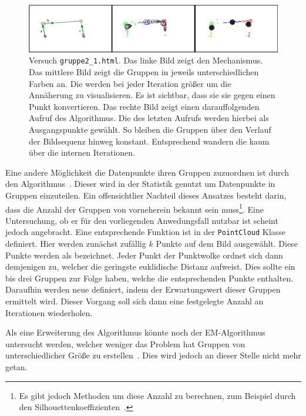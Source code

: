 \begin{figure}
    \centering
    \includegraphics[width=\textwidth]{gfx/k_means_centroids_edit.png}
    \caption[Versuch \lstinline{gruppe2_1.html}]{Versuch \lstinline{gruppe2_1.html}. Das linke Bild zeigt den Mechanismus. Das mittlere Bild zeigt die Gruppen in jeweils unterschiedlichen Farben an. Die  werden bei jeder Iteration grö{\ss}er um die Annäherung zu visualisieren. Es ist sichtbar, dass sie sie gegen einen Punkt konvertieren. Das rechte Bild zeigt einen darauffolgenden Aufruf des Algorithmus. Die  des letzten Aufrufs werden hierbei als Ausgangspunkte gewählt. So bleiben die Gruppen über den Verlauf der Bildsequenz hinweg konstant. Entsprechend wandern die  kaum über die internen Iterationen.}
    \label{fig:gruppe2_1}
\end{figure}

Eine andere Möglichkeit die Datenpunkte ihren Gruppen zuzuordnen ist durch den  Algorithmus~\cite[S.~241]{Geron2019}.
Dieser wird in der Statistik genutzt um Datenpunkte in Gruppen einzuteilen.
Ein offensichtlier Nachteil dieses Ansatzes besteht darin, dass die Anzahl der Gruppen von vorneherein bekannt sein muss\footnote{Es gibt jedoch Methoden um diese Anzahl zu berechnen, zum Beispiel durch den Silhouettenkoeffizienten~\cite[S.~247]{Geron2019}.}.
Eine Untersuchung, ob er für den vorliegenden Anwedungsfall nutzbar ist scheint jedoch angebracht.
Eine entsprechende Funktion ist in der \lstinline{PointCloud} Klasse definiert.
Hier werden zunächst zufällig $k$ Punkte auf dem Bild ausgewählt.
Diese Punkte werden als  bezeichnet.
Jeder Punkt der Punktwolke ordnet sich dann demjenigen  zu, welcher die geringste euklidische Distanz aufweist.
Dies sollte ein bis drei Gruppen zur Folge haben, welche die entsprechenden Punkte enthalten.
Daraufhin werden neue  definiert, indem der Erwartungswert dieser Gruppen ermittelt wird.
Dieser Vorgang soll sich dann eine festgelegte Anzahl an Iterationen wiederholen.

Als eine Erweiterung des  Algorithmus könnte noch der EM-Algorithmus untersucht werden, welcher weniger das Problem hat Gruppen von unterschiedlicher Grö{\ss}e zu erstellen~\cite[S.~262]{Geron2019}.
Dies wird jedoch an dieser Stelle nicht mehr getan.

